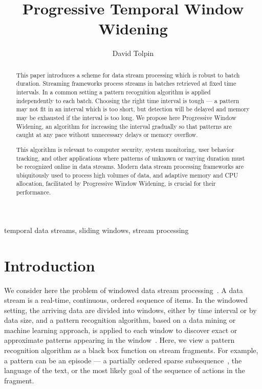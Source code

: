 \documentclass[runningheads,a4paper]{llncs}
\newcommand{\keywords}[1]{\par\addvspace\baselineskip
\noindent\keywordname\enspace\ignorespaces#1}
\begin{document}
\mainmatter  

\title{Progressive Temporal Window Widening}


\author{David Tolpin}






\maketitle

\begin{abstract}
	This paper introduces a scheme for data stream processing
	which is robust to batch duration. Streaming frameworks
	process streams in batches retrieved at fixed time
	intervals. In a common setting a pattern recognition
	algorithm is applied independently to each batch. Choosing
	the right time interval is tough --- a pattern may not fit
	in an interval which is too short, but detection will be
	delayed and memory may be exhausted if the interval is too
	long.  We propose here Progressive Window Widening, an
	algorithm for increasing the interval gradually so that
	patterns are caught at any pace without unnecessary delays
	or memory overflow.

	This algorithm is relevant to computer security, system
	monitoring, user behavior tracking, and other applications
	where patterns of unknown or varying duration must be
	recognized online in data streams. Modern data stream
	processing frameworks are ubiquitously used to process high
	volumes of data, and adaptive memory and CPU allocation,
	facilitated by Progressive Window Widening, is crucial for
	their performance.
\end{abstract}

\keywords{temporal data streams, sliding windows, stream processing}

\section{Introduction}

We consider here the problem of windowed data stream
processing~\cite{GO03}.  A data stream is a real-time,
continuous, ordered sequence of items.  In the windowed setting,
the arriving data are divided into windows, either by time
interval or by data size, and a pattern recognition algorithm,
based on a data mining or machine learning approach, is applied
to each window to discover exact or approximate patterns
appearing in the window~\cite{G12}. Here, we view a pattern
recognition algorithm as a black box function on stream
fragments. For example, a pattern can be an episode --- a
partially ordered sparse subsequence~\cite{MTI97}, the language
of the text, or the most likely goal of the sequence of actions
in the fragment.
\end{document}
